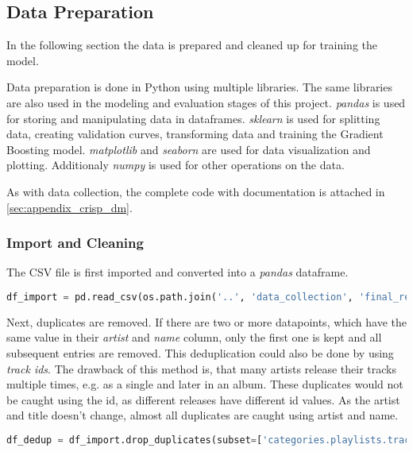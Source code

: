 \subsection{Data Preparation}
\label{sec:Data Preparation}

In the following section the data is prepared and cleaned up for training the model.

Data preparation is done in Python using multiple libraries. The same libraries
are also used in the modeling and evaluation stages of this project.
\emph{pandas} is used for storing and manipulating data in dataframes.
\emph{sklearn} is used for splitting data, creating validation curves,
transforming data and training the Gradient Boosting model.
\emph{matplotlib} and \emph{seaborn} are used for data visualization and plotting.
Additionaly \emph{numpy} is used for other operations on the data.

As with data collection, the complete code with documentation is attached in \ref{sec:appendix_crisp_dm}.

\subsubsection{Import and Cleaning}


The CSV file is first imported and converted into a \emph{pandas} dataframe.

\begin{lstlisting}[language=Python]
    df_import = pd.read_csv(os.path.join('..', 'data_collection', 'final_result.csv'))
\end{lstlisting}

Next, duplicates are removed. If there are two or more datapoints, which have the same value in their \emph{artist}
and \emph{name} column, only the first one is kept and all subsequent entries are removed.
This deduplication could also be done by using \emph{track ids}. The drawback of this method is, that many artists
release their tracks multiple times, e.g. as a single and later in an album. These duplicates would not be
caught using the id, as different releases have different id values. As the artist and title doesn't change, almost
all duplicates are caught using artist and name.

\begin{lstlisting}[language=Python]
    df_dedup = df_import.drop_duplicates(subset=['categories.playlists.tracks.artists', 'categories.playlists.tracks.name'])
\end{lstlisting}

